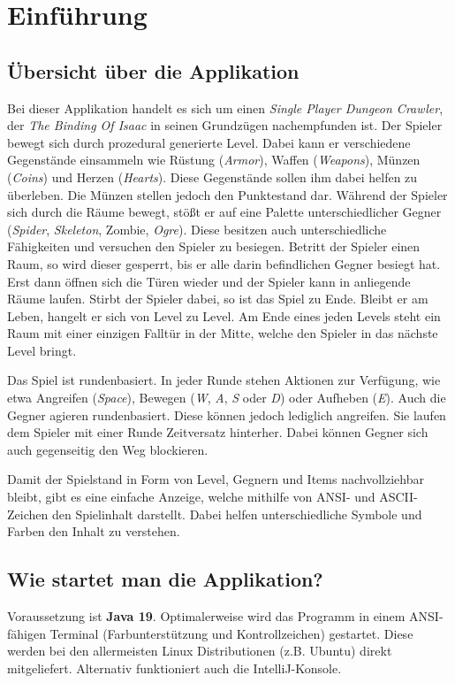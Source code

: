 \chapter{Einführung}

\section{Übersicht über die Applikation}
Bei dieser Applikation handelt es sich um einen
\textit{Single Player Dungeon Crawler}, der
\textit{The Binding Of Isaac} in seinen Grundzügen nachempfunden ist.
Der Spieler bewegt sich durch prozedural generierte Level. Dabei kann
er verschiedene Gegenstände einsammeln wie Rüstung (\textit{Armor}),
Waffen (\textit{Weapons}), Münzen (\textit{Coins}) und Herzen
(\textit{Hearts}). Diese Gegenstände sollen ihm dabei helfen zu
überleben. Die Münzen stellen jedoch den Punktestand dar.
Während der Spieler sich durch die Räume bewegt, stößt er
auf eine Palette unterschiedlicher Gegner (\textit{Spider}, 
\textit{Skeleton}, {Zombie}, \textit{Ogre}). Diese besitzen auch
unterschiedliche Fähigkeiten und versuchen den Spieler zu besiegen.
Betritt der Spieler einen Raum, so wird dieser gesperrt, bis er alle
darin befindlichen Gegner besiegt hat. Erst dann öffnen sich die Türen
wieder und der Spieler kann in anliegende Räume laufen.
Stirbt der Spieler dabei, so ist das Spiel zu Ende. Bleibt er am Leben,
hangelt er sich von Level zu Level. Am Ende eines jeden Levels steht
ein Raum mit einer einzigen Falltür in der Mitte, welche den Spieler
in das nächste Level bringt.

Das Spiel ist rundenbasiert. In jeder Runde stehen Aktionen zur 
Verfügung, wie etwa Angreifen (\textit{Space}), Bewegen
(\textit{W}, \textit{A}, \textit{S} oder \textit{D}) oder Aufheben
(\textit{E}). Auch die Gegner agieren rundenbasiert. Diese können
jedoch lediglich angreifen. Sie laufen dem Spieler mit einer Runde
Zeitversatz hinterher. Dabei können Gegner sich auch gegenseitig den
Weg blockieren.

Damit der Spielstand in Form von Level, Gegnern und Items nachvollziehbar
bleibt, gibt es eine einfache Anzeige, welche mithilfe von ANSI- und
ASCII-Zeichen den Spielinhalt darstellt. Dabei helfen unterschiedliche
Symbole und Farben den Inhalt zu verstehen.

\section{Wie startet man die Applikation?}
Voraussetzung ist \textbf{Java 19}. Optimalerweise wird das Programm
in einem ANSI-fähigen Terminal (Farbunterstützung und Kontrollzeichen)
gestartet. Diese werden bei den allermeisten Linux Distributionen
(z.B. Ubuntu) direkt mitgeliefert. Alternativ funktioniert auch die
IntelliJ-Konsole. \newline

